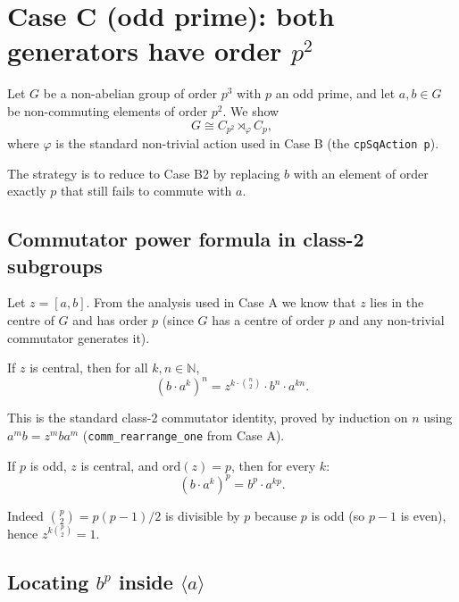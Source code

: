 


\section{Case C (odd prime): both generators have order \(p^2\)}

Let $G$ be a non-abelian group of order $p^3$ with $p$ an odd prime, and let
$a, b \in G$ be non-commuting elements of order $p^2$. We show
\[
  G \cong C_{p^2} \rtimes_{\varphi} C_p,
\]
where $\varphi$ is the standard non-trivial action used in Case B (the
\texttt{cpSqAction p}).

The strategy is to reduce to Case B2 by replacing $b$ with an element of order
exactly $p$ that still fails to commute with $a$.

\subsection{Commutator power formula in class-2 subgroups}

Let $z = [a,b]$. From the analysis used in Case A we know that $z$ lies in the
centre of $G$ and has order $p$ (since $G$ has a centre of order $p$ and any
non-trivial commutator generates it).

\begin{lemma}
If $z$ is central, then for all $k, n \in \mathbb{N}$,
\[
  (b \cdot a^k)^n = z^{k \cdot \binom{n}{2}} \cdot b^n \cdot a^{kn}.
\]
\end{lemma}

This is the standard class-2 commutator identity, proved by induction on $n$
using $a^m b = z^m b a^m$ (\texttt{comm\_rearrange\_one} from Case A).

\begin{lemma}
If $p$ is odd, $z$ is central, and $\mathrm{ord}(z) = p$, then for every $k$:
\[
  (b \cdot a^k)^p = b^p \cdot a^{kp}.
\]
\end{lemma}

Indeed $\binom{p}{2} = p(p-1)/2$ is divisible by $p$ because $p$ is odd (so
$p-1$ is even), hence $z^{k\binom{p}{2}} = 1$.

\subsection{Locating \(b^p\) inside \(\langle a\rangle\)}

